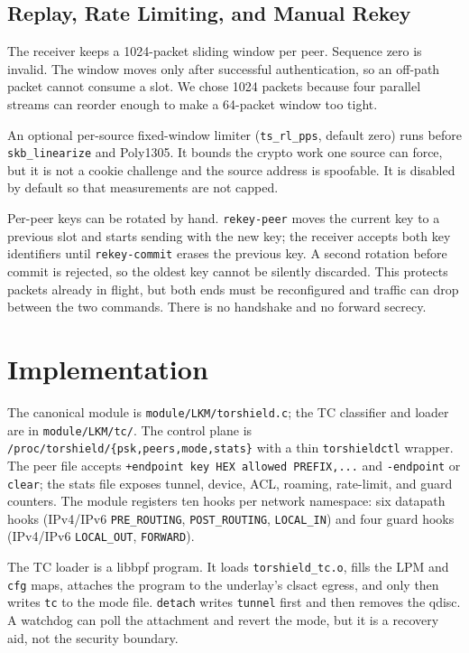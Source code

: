 \documentclass[conference]{IEEEtran}
\newcommand{\code}[1]{\texttt{#1}}
\begin{document}
\subsection{Replay, Rate Limiting, and Manual Rekey}
The receiver keeps a 1024-packet sliding window per peer. Sequence zero is invalid. The window moves only after successful authentication, so an off-path packet cannot consume a slot. We chose 1024 packets because four parallel streams can reorder enough to make a 64-packet window too tight.

An optional per-source fixed-window limiter (\code{ts\_rl\_pps}, default zero) runs before \code{skb\_linearize} and Poly1305. It bounds the crypto work one source can force, but it is not a cookie challenge and the source address is spoofable. It is disabled by default so that measurements are not capped.

Per-peer keys can be rotated by hand. \code{rekey-peer} moves the current key to a previous slot and starts sending with the new key; the receiver accepts both key identifiers until \code{rekey-commit} erases the previous key. A second rotation before commit is rejected, so the oldest key cannot be silently discarded. This protects packets already in flight, but both ends must be reconfigured and traffic can drop between the two commands. There is no handshake and no forward secrecy.

\section{Implementation}
The canonical module is \code{module/LKM/torshield.c}; the TC classifier and loader are in \code{module/LKM/tc/}. The control plane is \code{/proc/torshield/\{psk,peers,mode,stats\}} with a thin \code{torshieldctl} wrapper. The peer file accepts \code{+endpoint key HEX allowed PREFIX,...} and \code{-endpoint} or \code{clear}; the stats file exposes tunnel, device, ACL, roaming, rate-limit, and guard counters. The module registers ten hooks per network namespace: six datapath hooks (IPv4/IPv6 \code{PRE\_ROUTING}, \code{POST\_ROUTING}, \code{LOCAL\_IN}) and four guard hooks (IPv4/IPv6 \code{LOCAL\_OUT}, \code{FORWARD}).

The TC loader is a libbpf program. It loads \code{torshield\_tc.o}, fills the LPM and \code{cfg} maps, attaches the program to the underlay's clsact egress, and only then writes \code{tc} to the mode file. \code{detach} writes \code{tunnel} first and then removes the qdisc. A watchdog can poll the attachment and revert the mode, but it is a recovery aid, not the security boundary.
\end{document}
